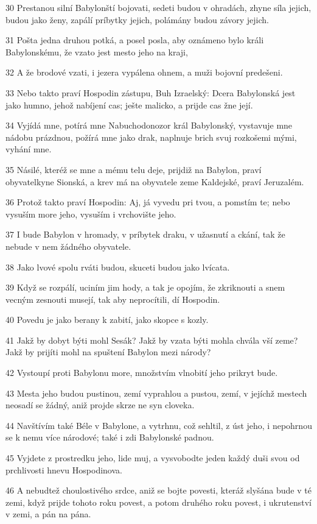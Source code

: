 \par 30 Prestanou silní Babylonští bojovati, sedeti budou v ohradách, zhyne síla jejich, budou jako ženy, zapálí príbytky jejich, polámány budou závory jejich.
\par 31 Pošta jedna druhou potká, a posel posla, aby oznámeno bylo králi Babylonskému, že vzato jest mesto jeho na kraji,
\par 32 A že brodové vzati, i jezera vypálena ohnem, a muži bojovní predešeni.
\par 33 Nebo takto praví Hospodin zástupu, Buh Izraelský: Dcera Babylonská jest jako humno, jehož nabíjení cas; ješte malicko, a prijde cas žne její.
\par 34 Vyjídá mne, potírá mne Nabuchodonozor král Babylonský, vystavuje mne nádobu prázdnou, požírá mne jako drak, naplnuje brich svuj rozkošemi mými, vyhání mne.
\par 35 Násilé, kteréž se mne a mému telu deje, prijdiž na Babylon, praví obyvatelkyne Sionská, a krev má na obyvatele zeme Kaldejské, praví Jeruzalém.
\par 36 Protož takto praví Hospodin: Aj, já vyvedu pri tvou, a pomstím te; nebo vysuším more jeho, vysuším i vrchovište jeho.
\par 37 I bude Babylon v hromady, v príbytek draku, v užasnutí a ckání, tak že nebude v nem žádného obyvatele.
\par 38 Jako lvové spolu rváti budou, skuceti budou jako lvícata.
\par 39 Když se rozpálí, uciním jim hody, a tak je opojím, že zkriknouti a snem vecným zesnouti musejí, tak aby neprocítili, dí Hospodin.
\par 40 Povedu je jako berany k zabití, jako skopce s kozly.
\par 41 Jakž by dobyt býti mohl Sesák? Jakž by vzata býti mohla chvála vší zeme? Jakž by prijíti mohl na spuštení Babylon mezi národy?
\par 42 Vystoupí proti Babylonu more, množstvím vlnobití jeho prikryt bude.
\par 43 Mesta jeho budou pustinou, zemí vyprahlou a pustou, zemí, v jejíchž mestech neosadí se žádný, aniž projde skrze ne syn cloveka.
\par 44 Navštívím také Béle v Babylone, a vytrhnu, což sehltil, z úst jeho, i nepohrnou se k nemu více národové; také i zdi Babylonské padnou.
\par 45 Vyjdete z prostredku jeho, lide muj, a vysvobodte jeden každý duši svou od prchlivosti hnevu Hospodinova.
\par 46 A nebudtež choulostivého srdce, aniž se bojte povesti, kteráž slyšána bude v té zemi, když prijde tohoto roku povest, a potom druhého roku povest, i ukrutenství v zemi, a pán na pána.
